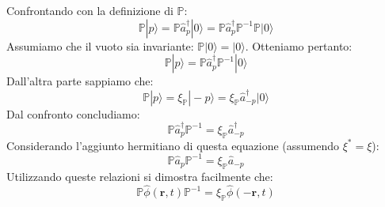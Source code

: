 Confrontando con la definizione di $\mathbb{P}$:
\[
\mathbb{P}|p\rangle = \mathbb{P} \hat{a}_p^\dagger |0\rangle = \mathbb{P} \hat{a}_p^\dagger \mathbb{P}^{-1} \mathbb{P} |0\rangle
\]
Assumiamo che il vuoto sia invariante: $\mathbb{P}|0\rangle = |0\rangle$.
Otteniamo pertanto:
\[
\mathbb{P}|p\rangle = \mathbb{P} \hat{a}_p^\dagger \mathbb{P}^{-1} |0\rangle
\]
Dall'altra parte sappiamo che:
\[
\mathbb{P}|p\rangle = \xi_{\mathbb{P}} |-p\rangle = \xi_{\mathbb{P}} \hat{a}_{-p}^\dagger |0\rangle
\]
Dal confronto concludiamo:
\[
\mathbb{P} \hat{a}_p^\dagger \mathbb{P}^{-1} = \xi_{\mathbb{P}} \hat{a}_{-p}^\dagger
\]
Considerando l'aggiunto hermitiano di questa equazione (assumendo $\xi^* = \xi$):
\[
\mathbb{P} \hat{a}_p \mathbb{P}^{-1} = \xi_{\mathbb{P}} \hat{a}_{-p}
\]
Utilizzando queste relazioni si dimostra facilmente che:
\[
\mathbb{P} \hat{\phi}(\mathbf{r},t) \mathbb{P}^{-1} = \xi_{\mathbb{P}} \hat{\phi}(-\mathbf{r},t)
\]